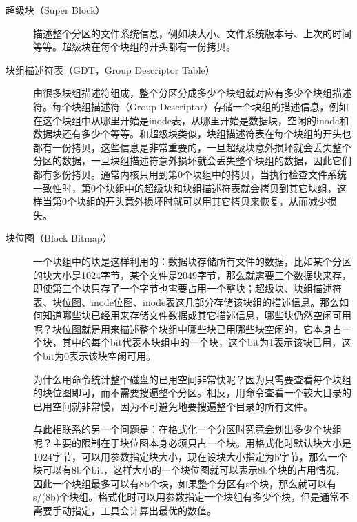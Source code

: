 \begin{description}
\item[{超级块（Super Block）}]


描述整个分区的文件系统信息，例如块大小、文件系统版本号、上次的时间等等。超级块在每个块组的开头都有一份拷贝。

\item[{块组描述符表（GDT，Group Descriptor Table）}]


由很多块组描述符组成，整个分区分成多少个块组就对应有多少个块组描述符。每个块组描述符（Group Descriptor）存储一个块组的描述信息，例如在这个块组中从哪里开始是inode表，从哪里开始是数据块，空闲的inode和数据块还有多少个等等。和超级块类似，块组描述符表在每个块组的开头也都有一份拷贝，这些信息是非常重要的，一旦超级块意外损坏就会丢失整个分区的数据，一旦块组描述符意外损坏就会丢失整个块组的数据，因此它们都有多份拷贝。通常内核只用到第0个块组中的拷贝，当执行检查文件系统一致性时，第0个块组中的超级块和块组描述符表就会拷贝到其它块组，这样当第0个块组的开头意外损坏时就可以用其它拷贝来恢复，从而减少损失。

\item[{块位图（Block Bitmap）}]


一个块组中的块是这样利用的：数据块存储所有文件的数据，比如某个分区的块大小是1024字节，某个文件是2049字节，那么就需要三个数据块来存，即使第三个块只存了一个字节也需要占用一个整块；超级块、块组描述符表、块位图、inode位图、inode表这几部分存储该块组的描述信息。那么如何知道哪些块已经用来存储文件数据或其它描述信息，哪些块仍然空闲可用呢？块位图就是用来描述整个块组中哪些块已用哪些块空闲的，它本身占一个块，其中的每个bit代表本块组中的一个块，这个bit为1表示该块已用，这个bit为0表示该块空闲可用。



为什么用命令统计整个磁盘的已用空间非常快呢？因为只需要查看每个块组的块位图即可，而不需要搜遍整个分区。相反，用命令查看一个较大目录的已用空间就非常慢，因为不可避免地要搜遍整个目录的所有文件。



与此相联系的另一个问题是：在格式化一个分区时究竟会划出多少个块组呢？主要的限制在于块位图本身必须只占一个块。用格式化时默认块大小是1024字节，可以用参数指定块大小，现在设块大小指定为b字节，那么一个块可以有8b个bit，这样大小的一个块位图就可以表示8b个块的占用情况，因此一个块组最多可以有8b个块，如果整个分区有s个块，那么就可以有s/\BookSplit{}(8b)个块组。格式化时可以用参数指定一个块组有多少个块，但是通常不需要手动指定，工具会计算出最优的数值。


\end{description}
